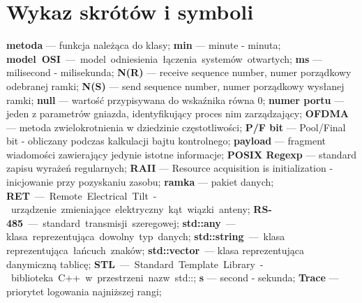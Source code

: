 \chapter*{Wykaz skrótów i symboli}
\noindent
\textbf{metoda} --- funkcja należąca do klasy;\newline
\textbf{min} --- minute - minuta;\newline
\textbf{model OSI} --- model odniesienia łączenia systemów otwartych;\newline
\textbf{ms} --- milisecond - milisekunda;\newline
\textbf{N(R)} --- receive sequence number, numer porządkowy odebranej ramki;\newline
\textbf{N(S)} --- send sequence number, numer porządkowy wysłanej ramki;\newline
\textbf{null} --- wartość przypisywana do wskaźnika równa 0;\newline
\textbf{numer portu} --- jeden z parametrów gniazda, identyfikujący proces nim zarządzający;\newline
\textbf{OFDMA} --- metoda zwielokrotnienia w dziedzinie częstotliwości;\newline
\textbf{P/F bit} --- Pool/Final bit - obliczany podczas kalkulacji bajtu kontrolnego;\newline
\textbf{payload} --- fragment wiadomości zawierający jedynie istotne informacje;\newline
\textbf{POSIX Regexp} --- standard zapisu wyrażeń regularnych;\newline
\textbf{RAII} --- Resource acquisition is initialization - inicjowanie przy pozyskaniu zasobu;\newline
\textbf{ramka} --- pakiet danych;\newline
\textbf{RET} --- Remote Electrical Tilt - urządzenie zmieniające elektryczny kąt wiązki anteny;\newline
\textbf{RS-485} --- standard transmisji szeregowej;\newline
\textbf{std::any} --- klasa reprezentująca dowolny typ danych;\newline
\textbf{std::string} --- klasa reprezentująca łańcuch znaków;\newline
\textbf{std::vector} --- klasa reprezentująca danymiczną tablicę;\newline
\textbf{STL} --- Standard Template Library - biblioteka C++ w przestrzeni nazw std::;\newline
\textbf{s} --- second - sekunda;\newline
\textbf{Trace} --- priorytet logowania najniższej rangi;\newline
